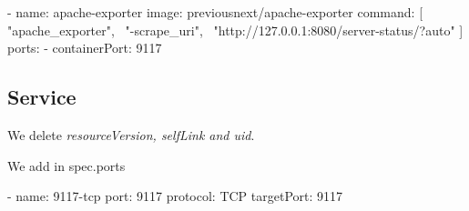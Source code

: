 \begin{bashcode}
  - name: apache-exporter
  image: previousnext/apache-exporter
  command: [ "apache_exporter", \
  "-scrape_uri", \
  "http://127.0.0.1:8080/server-status/?auto" ]
  ports:
  - containerPort: 9117
\end{bashcode}

\subsection{Service}
We delete \emph{resourceVersion, selfLink and uid}.

We add in spec.ports

\begin{bashcode}
  - name: 9117-tcp
  port: 9117
  protocol: TCP
  targetPort: 9117
\end{bashcode}